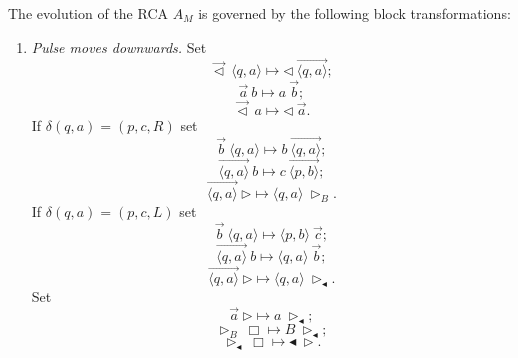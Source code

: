 \documentclass[pre,amssymb,showpacs,showkeys,preprint]{revtex4}
\begin{document}
The evolution of the RCA $A_M$ is governed by the following block transformations:
\begin{enumerate}

\item
\emph{Pulse moves downwards.}
Set
\begin{equation}
\overrightarrow{\lhd} \: \langle q, a \rangle \mapsto \lhd \:
\overrightarrow{\langle q, a \rangle};
\label{tr:start-state}
\end{equation}
\begin{equation}
\overrightarrow{a} \: b \mapsto a \: \overrightarrow{b};
\label{tr:down}
\end{equation}
\begin{equation}
\overrightarrow{\lhd} \:a \mapsto \lhd \: \overrightarrow{a}.
\label{tr:start}
\end{equation}
If $\delta(q,a) = (p,c,R)$ set
\begin{equation}
\overrightarrow{b} \: \langle q, a \rangle \mapsto b \:
\overrightarrow{\langle q, a \rangle};
\label{tr:down-to-head}
\end{equation}
\begin{equation}
\overrightarrow{\langle q,a \rangle} \: b \mapsto c \:
\overrightarrow{\langle p, b \rangle};
\label{tr:right-2}
\end{equation}
\begin{equation}
\overrightarrow{\langle q,a \rangle} \: \rhd \mapsto \langle q,a \rangle \:
\rhd_B.
\label{tr:down-state-right-delimiter-blank}
\end{equation}
If $\delta(q,a) = (p,c,L)$ set
\begin{equation}
\overrightarrow{b} \: \langle q, a \rangle \mapsto \langle p, b \rangle \:
\overrightarrow{c};
\label{tr:left-1}
\end{equation}
\begin{equation}
\overrightarrow{\langle q,a \rangle} \: b \mapsto \langle q,a \rangle \:
\overrightarrow{b};
\label{tr:left-no-move}
\end{equation}
\begin{equation}
\overrightarrow{\langle q,a \rangle} \: \rhd \mapsto \langle q,a \rangle \:
\rhd_\blacktriangleleft.
\label{tr:down-state-right-delimiter}
\end{equation}
Set
\begin{equation}
\overrightarrow{a} \: \rhd \mapsto a \: \rhd_\blacktriangleleft;
\label{tr:down-a-rhd}
\end{equation}
\begin{equation}
\rhd_B \: \Box \mapsto B \: \rhd_\blacktriangleleft;
\label{tr:new-blank}
\end{equation}
\begin{equation}
\rhd_\blacktriangleleft \: \Box \mapsto \blacktriangleleft \: \rhd.
\label{tr:reflection-right}
\end{equation}


\end{enumerate}
\end{document}

